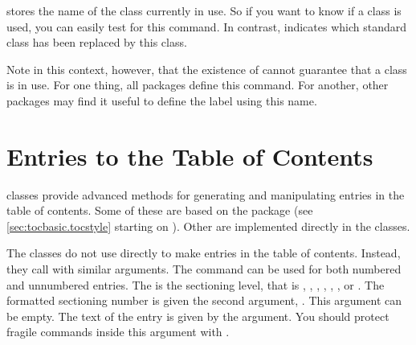 \begin{Declaration}
\end{Declaration}
 stores the name of the \KOMAScript{} class currently in
use. So if you want to know if a \KOMAScript{} class is used, you can easily
test for this command. In contrast,  indicates which standard
class has been replaced by this \KOMAScript{} class.

Note in this context, however, that the existence of
 cannot guarantee that a
\KOMAScript{} class is in use. For one thing, all \KOMAScript{} packages
define this command. For another, other packages may find it useful to define
the \KOMAScript{} label using this name.%
% 
\EndIndexGroup

\section{Entries to the Table of Contents}

\KOMAScript{} classes provide advanced methods for generating and
manipulating entries in the table of contents. Some of these are based on
the  package (see \autoref{sec:tocbasic.tocstyle} starting
on ). Other are implemented directly in the
classes.

\begin{Declaration}
\end{Declaration}
The \KOMAScript{} classes do not use
%
 directly to make entries in the table of
contents. Instead, they call  with similar
arguments. The command can be used for both numbered and unnumbered entries.
The  is the sectioning level, that is ,
, , ,
, , or . The
formatted sectioning number is given the second argument, . This
argument can be empty. The text of the entry is given by the 
argument. You should protect fragile commands inside this argument with
.

